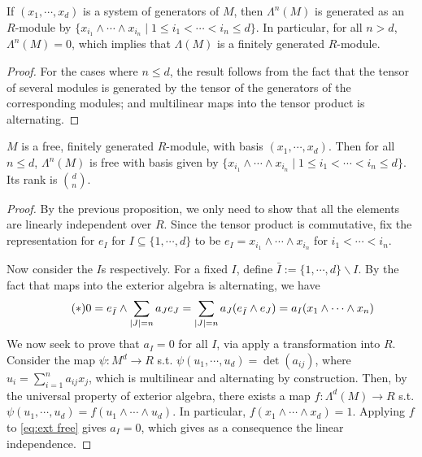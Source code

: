 \begin{proposition}
    If $(x_1, \cdots, x_d)$ is a system of generators of $M$, then $\Lambda^n(M)$ is generated as an $R$-module by $\{ x_{i_1} \wedge \cdots \wedge x_{i_n} \mid 1 \leq i_1 < \cdots < i_n \leq d \}$. In particular, for all $n > d$, $\Lambda^n(M) = 0$, which implies that $\Lambda(M)$ is a finitely generated $R$-module. 
\end{proposition}

\begin{proof}
    For the cases where $n \leq d$, the result follows from the fact that the tensor of several modules is generated by the tensor of the generators of the corresponding modules; and multilinear maps into the tensor product is alternating.
\end{proof}

\begin{proposition}
    $M$ is a free, finitely generated $R$-module, with basis $(x_1, \cdots, x_d)$. Then for all $n \leq d$, $\Lambda^n(M)$ is free with basis given by $\{x_{i_1} \wedge \cdots \wedge x_{i_n} \mid 1 \leq i_1 < \cdots < i_n \leq d\}$. Its rank is $\binom{d}{n}$.
\end{proposition}

\begin{proof}
    By the previous proposition, we only need to show that all the elements are linearly independent over $R$. Since the tensor product is commutative, fix the representation for $e_I$ for $I \subseteq \{1, \cdots, d\}$ to be $e_I = x_{i_1} \wedge \cdots \wedge x_{i_n}$ for $i_1 < \cdots < i_n$.

    Now consider the $I$s respectively. For a fixed $I$, define $\bar{I} := \{1, \cdots, d\} \backslash I$. By the fact that maps into the exterior algebra is alternating, we have
    \begin{equation}\label{eq:ext free}\tag{$\ast$}
        0 = e_{\bar{I}} \wedge \sum_{\left|J\right| = n} a_J e_J = \sum_{\left|J\right| = n} a_J (e_{\bar{I}} \wedge e_J) = a_I (x_1 \wedge \cdots \wedge x_n)
    \end{equation}
    We now seek to prove that $a_I = 0$ for all $I$, via apply a transformation into $R$. Consider the map $\psi: M^d \to R$ s.t. $\psi(u_1, \cdots, u_d) = \det (a_{ij})$, where $u_i = \sum_{i=1}^n a_{ij} x_j$, which is multilinear and alternating by construction. Then, by the universal property of exterior algebra, there exists a map $f: \Lambda^d(M) \to R$ s.t. $\psi(u_1, \cdots, u_d) = f(u_1 \wedge \cdots \wedge u_d)$. In particular, $f(x_1 \wedge \cdots \wedge x_d) = 1$. Applying $f$ to \eqref{eq:ext free} gives $a_I = 0$, which gives as a consequence the linear independence. 
\end{proof}

